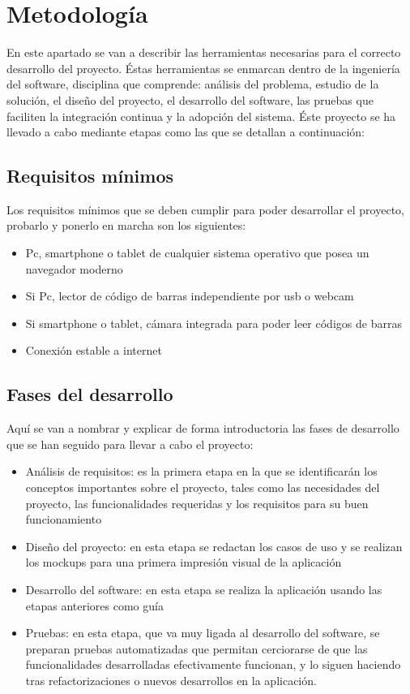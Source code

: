 
\chapter{Metodología}
\label{metodologia}
En este apartado se van a describir las herramientas necesarias para el correcto desarrollo del proyecto. Éstas herramientas se enmarcan dentro de la
ingeniería del software, disciplina que comprende: análisis del problema, estudio de la solución, el diseño del proyecto, el desarrollo del software, las pruebas que faciliten la integración continua y la adopción del sistema. Éste proyecto se ha llevado a cabo mediante etapas como las que se detallan a continuación:
\section{Requisitos mínimos}
Los requisitos mínimos que se deben cumplir para poder desarrollar el proyecto, probarlo y ponerlo en marcha son los siguientes:
\begin{itemize}
    \item Pc, smartphone o tablet de cualquier sistema operativo que posea un navegador moderno
    \item Si Pc, lector de código de barras independiente por usb o webcam
    \item Si smartphone o tablet, cámara integrada para poder leer códigos de barras
    \item Conexión estable a internet
\end{itemize}
\section{Fases del desarrollo}
Aquí se van a nombrar y explicar de forma introductoria las fases de desarrollo que se han seguido para llevar a cabo el proyecto:
\begin{itemize}
    \item Análisis de requisitos: es la primera etapa en la que se identificarán los conceptos importantes sobre el proyecto, tales como las necesidades del proyecto, las funcionalidades requeridas y los requisitos para su buen funcionamiento
    \item Diseño del proyecto: en esta etapa se redactan los casos de uso y se realizan los mockups para una primera impresión visual de la aplicación
    \item Desarrollo del software: en esta etapa se realiza la aplicación usando las etapas anteriores como guía
    \item Pruebas: en esta etapa, que va muy ligada al desarrollo del software, se preparan pruebas automatizadas que permitan cerciorarse de que las funcionalidades desarrolladas efectivamente funcionan, y lo siguen haciendo tras refactorizaciones o nuevos desarrollos en la aplicación.
\end{itemize}
